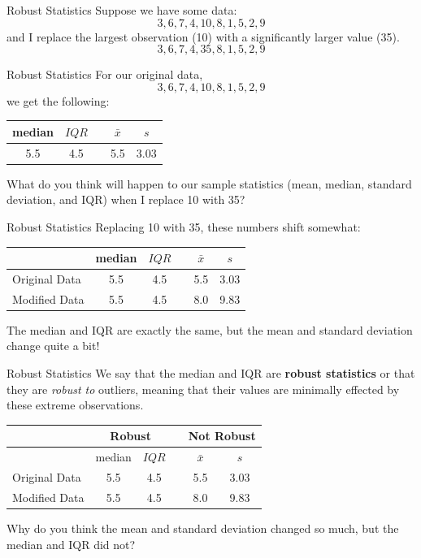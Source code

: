 \begin{frame}{Robust Statistics}
    Suppose we have some data:
    \[
    3,  6,  7,  4, 10,  8,  1,  5,  2,  9
    \]
    and I replace the largest observation (10) with a significantly larger value (35).
    \[
    3,  6,  7,  4, 35,  8,  1,  5,  2,  9
    \]
\end{frame}

\begin{frame}{Robust Statistics}
    For our original data,
    \[
    3,  6,  7,  4, 10,  8,  1,  5,  2,  9
    \]
    we get the following:
    \begin{table}[]
        \begin{tabular}{ccccc}
        median & $IQR$ & & $\bar{x}$ & $s$ \\ 
        \hline
        5.5 & 4.5 & & 5.5 & 3.03 
        \end{tabular}
    \end{table}
    
    \vspace{12pt}What do you think will happen to our sample statistics (mean, median, standard deviation, and IQR) when I replace 10 with 35?
\end{frame}

\begin{frame}{Robust Statistics}
    Replacing 10 with 35, these numbers shift somewhat:
    \begin{table}[]
        \begin{tabular}{lccccc}
        & median & $IQR$ & & $\bar{x}$ & $s$ \\ 
        \hline
        Original Data & 5.5 & 4.5 & & 5.5 & 3.03 \\
        Modified Data & 5.5 & 4.5 & & 8.0 & 9.83
        \end{tabular}
    \end{table}
    
    \vspace{12pt}The median and IQR are exactly the same, but the mean and standard deviation change quite a bit!
\end{frame}

\begin{frame}{Robust Statistics}
    We say that the median and IQR are \textbf{robust statistics} or that they are \textit{robust to} outliers, meaning that their values are minimally effected by these extreme observations. 
    \begin{table}[]
        \begin{tabular}{lccccc}
        & \multicolumn{2}{c}{Robust} && \multicolumn{2}{c}{Not Robust} \\
        \hline
        & median & $IQR$ & & $\bar{x}$ & $s$ \\ 
        \hline
        Original Data & 5.5 & 4.5 & & 5.5 & 3.03 \\
        Modified Data & 5.5 & 4.5 & & 8.0 & 9.83
        \end{tabular}
    \end{table}
    
    \vspace{12pt}Why do you think the mean and standard deviation changed so much, but the median and IQR did not?
\end{frame}


